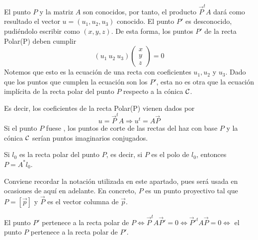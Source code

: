 El punto $P$ y la matriz $A$ son conocidos, por tanto, el producto $\vec{P}^tA$ dará como resultado el vector $u=(u_1, u_2,u_3)$ conocido. El punto $P'$ es desconocido, pudiéndolo escribir como $(x, y,z)$. De esta forma, los puntos $P'$ de la recta Polar(P) deben cumplir
\begin{equation}
(u_1 \ u_2 \ u_3)
\left( \begin{array}{c}
x\\ y\\ z
\end{array}\right) =0
\end{equation}
Notemos que esto es la ecuación de una recta con coeficientes $u_1,u_2$ y $u_3$. Dado que los puntos que cumplen la ecuación son los $P'$, esta no es otra que la ecuación implícita de la recta polar del punto $P$ respecto a la cónica $\mathcal{C}$.

Es decir, los coeficientes de la recta Polar(P) vienen dados por
\begin{equation}
u=\vec{P}^tA\Rightarrow u^t=A\vec{P}
\end{equation}
Si el punto $P$ fuese , los puntos de corte de las rectas del haz con base $P$ y la cónica $\mathcal{C}$ serían puntos imaginarios conjugados.
\begin{obs}
	Si $l_0$ es la recta polar del punto $P$, es decir, si $P$ es el polo de $l_0$, entonces $P=A^*l_0$.
\end{obs}
\begin{obs}
	Conviene recordar la notación utilizada en este apartado, pues será usada en ocasiones de aquí en adelante. En concreto, $P$ es un punto proyectivo tal que $P=[\vec{p}]$ y $\vec{P}$ es el vector columna de $\vec{p}$.
\end{obs}

\begin{obs}
	El punto $P'$ pertenece a la recta polar de $P\Leftrightarrow  \vec{P}^tA\vec{P}'=0\Leftrightarrow \vec{P}'^tA\vec{P}=0\Leftrightarrow $ el punto $P$ pertenece a la recta polar de $P'$.
\end{obs}

